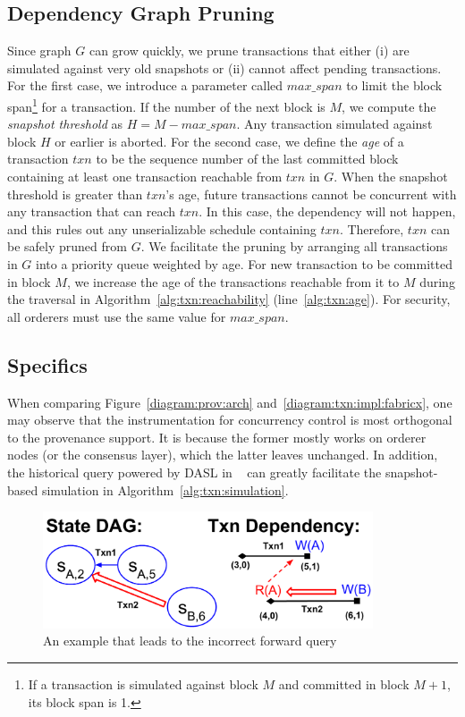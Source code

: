 {\subsection{Dependency Graph Pruning}
\label{sec:txn:impl:optimization}
Since graph $G$ can grow quickly, we prune transactions that either (i) are simulated against very old snapshots or (ii) cannot affect pending transactions.
%
For the first case, we introduce a parameter called $max\_span$ to limit the block span\footnote{If a transaction is simulated against block $M$ and committed in block $M+1$, its block span is 1.} for
a transaction.
%
If the number of the next block is $M$, we compute the \textit{snapshot
  threshold} as $H = M - max\_span$.
%
Any transaction simulated against block $H$ or earlier is aborted.
%
For the second case, we define the \textit{age} of a transaction $txn$ to be the sequence
number of the last committed block containing at least one transaction reachable
from $txn$ in $G$.
%
When the snapshot threshold is greater than $txn$'s age, future transactions
cannot be concurrent with any transaction that can reach $txn$.
%
In this case, the  dependency will not happen, and this rules
out any unserializable schedule containing $txn$.
%
Therefore, $txn$ can be safely pruned from $G$.
%
We facilitate the pruning by arranging all transactions in $G$ into a priority
queue weighted by age.
%
For new transaction to be committed in block $M$, we increase the age of the
transactions reachable from it to $M$ during the traversal in
Algorithm~\ref{alg:txn:reachability} (line~\ref{alg:txn:age}).
%
For security, all orderers must use the same value for $max\_span$.

\subsection{{\fs} Specifics}
\label{sec:txn:impl:sharp}
When comparing Figure~\ref{diagram:prov:arch} and~\ref{diagram:txn:impl:fabricx}, one may observe that the instrumentation for concurrency control is most orthogonal to the provenance support. 
It is because the former mostly works on orderer nodes (or the consensus layer), which the latter leaves unchanged. 
In addition, the historical query powered by DASL in ~ can greatly facilitate the snapshot-based simulation in Algorithm~\ref{alg:txn:simulation}. 

\begin{figure}
  \centering
	\includegraphics[width=0.87\textwidth]{diagram/txn/odd.pdf}
  \caption{An example that leads to the incorrect forward query}
	\label{diagram:txn:impl:sharp}
\end{figure}

}
